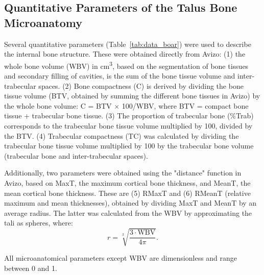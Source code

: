 \documentclass[12pt,a4paper]{article}
\begin{document}
\subsection{Quantitative Parameters of the Talus Bone Microanatomy}
Several quantitative parameters (Table~\ref{tab:data_boar}) were used to describe the internal bone structure. These were obtained directly from Avizo: (1) the whole bone volume (WBV) in cm\textsuperscript{3}, based on the segmentation of bone tissues and secondary filling of cavities, is the sum of the bone tissue volume and inter-trabecular spaces. (2) Bone compactness (C) is derived by dividing the bone tissue volume (BTV, obtained by summing the different bone tissues in Avizo) by the whole bone volume: C = BTV $\times$ 100/WBV, where BTV = compact bone tissue + trabecular bone tissue. (3) The proportion of trabecular bone (\%Trab) corresponds to the trabecular bone tissue volume multiplied by 100, divided by the BTV. (4) Trabecular compactness (TC) was calculated by dividing the trabecular bone tissue volume multiplied by 100 by the trabecular bone volume (trabecular bone and inter-trabecular spaces). 

Additionally, two parameters were obtained using the "distance" function in Avizo, based on MaxT, the maximum cortical bone thickness, and MeanT, the mean cortical bone thickness. These are (5) RMaxT and (6) RMeanT (relative maximum and mean thicknesses), obtained by dividing MaxT and MeanT by an average radius. The latter was calculated from the WBV by approximating the tali as spheres, where:
\begin{equation}
r = \sqrt[3]{\frac{3 \cdot \text{WBV}}{4\pi}}.
\end{equation}

All microanatomical parameters except WBV are dimensionless and range between 0 and 1.
\end{document}
